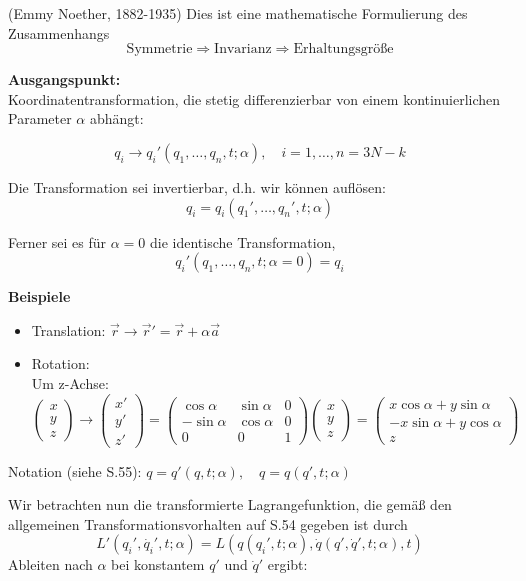 \documentclass[10pt, letterpaper]{article}
\begin{document}
(Emmy Noether, 1882-1935) Dies ist eine mathematische Formulierung des Zusammenhangs
\[
\text{Symmetrie} \Rightarrow \text{Invarianz} \Rightarrow \text{Erhaltungsgröße}
\]

\textbf{Ausgangspunkt:}\\
Koordinatentransformation, die stetig differenzierbar von einem kontinuierlichen Parameter $\alpha$ abhängt:

\[q_i \to q_i'(q_1,\ldots,q_n,t;\alpha), \quad i=1,\ldots,n = 3N-k\]

Die Transformation sei invertierbar, d.h. wir können auflösen:
\[q_i = q_i(q_1',\ldots,q_n',t;\alpha)\]

Ferner sei es für $\alpha=0$ die identische Transformation,
\[q_i'(q_1,\ldots,q_n,t;\alpha=0) = q_i\]

\textbf{Beispiele}
\begin{itemize}
\item Translation: $\vec{r} \to \vec{r}' = \vec{r} + \alpha\vec{a}$
\item Rotation:\\
Um z-Achse: $\begin{pmatrix} x \\ y \\ z \end{pmatrix} \to \begin{pmatrix} x' \\ y' \\ z' \end{pmatrix} = \begin{pmatrix} \cos\alpha & \sin\alpha & 0 \\ -\sin\alpha & \cos\alpha & 0 \\ 0 & 0 & 1 \end{pmatrix} \begin{pmatrix} x \\ y \\ z \end{pmatrix} = \begin{pmatrix} x\cos\alpha+y\sin\alpha \\ -x\sin\alpha+y\cos\alpha \\ z \end{pmatrix}$
\end{itemize}

Notation (siehe S.55): $q = q'(q,t;\alpha), \quad q = q(q',t;\alpha)$

Wir betrachten nun die transformierte Lagrangefunktion, die gemäß den allgemeinen Transformationsvorhalten auf S.54 gegeben ist durch
\[L'(q_i',\dot{q_i}',t;\alpha) = L(q(q_i',t;\alpha), \dot{q}(q',\dot{q}',t;\alpha), t)\]
Ableiten nach $\alpha$ bei konstantem $q'$ und $\dot{q}'$ ergibt:
\end{document}

